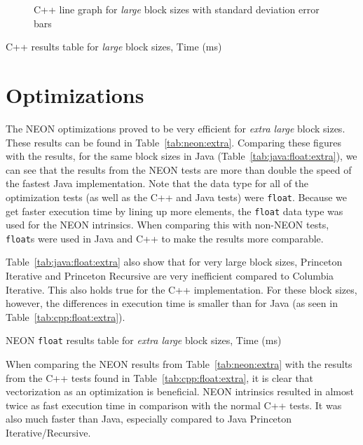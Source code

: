 \begin{figure}
    \centering
    
    \caption{C++ line graph for \emph{large} block sizes with standard deviation error bars}
    \label{fig:cpp:line:large}
\end{figure}
\begin{table}
    \centering
    \caption{C++ results table for \emph{large} block sizes, Time (ms)}
    \label{tab:cpp:large}
    \resizebox{\columnwidth}{!}{
        
    }
\end{table}

\section{Optimizations}
The NEON optimizations proved to be very efficient for \emph{extra large} block sizes. These results can be found in Table~\ref{tab:neon:extra}. Comparing these figures with the results, for the same block sizes in Java (Table~\ref{tab:java:float:extra}), we can see that the results from the NEON tests are more than double the speed of the fastest Java implementation. Note that the data type for all of the optimization tests (as well as the C++ and Java tests) were \texttt{float}. Because we get faster execution time by lining up more elements, the \texttt{float} data type was used for the NEON intrinsics. When comparing this with non-NEON tests, \texttt{float}s were used in Java and C++ to make the results more comparable.

Table~\ref{tab:java:float:extra} also show that for very large block sizes, Princeton Iterative and Princeton Recursive are very inefficient compared to Columbia Iterative. This also holds true for the C++ implementation. For these block sizes, however, the differences in execution time is smaller than for Java (as seen in Table~\ref{tab:cpp:float:extra}).

\begin{table}
    \centering
    \caption{NEON \texttt{float} results table for \emph{extra large} block sizes, Time (ms)}
    \label{tab:neon:extra}
    
\end{table}

When comparing the NEON results from Table~\ref{tab:neon:extra} with the results from the C++ tests found in Table~\ref{tab:cpp:float:extra}, it is clear that vectorization as an optimization is beneficial. NEON intrinsics resulted in almost twice as fast execution time in comparison with the normal C++ tests. It was also much faster than Java, especially compared to Java Princeton Iterative/Recursive.

